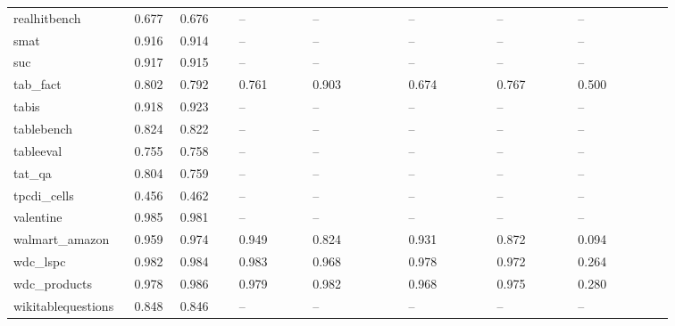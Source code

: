 \begin{table}[htbp]
\begin{tabular}{p{0.112\linewidth}p{0.063\linewidth}p{0.081\linewidth}p{0.104\linewidth}p{0.130\linewidth}p{0.123\linewidth}p{0.112\linewidth}p{0.133\linewidth}}
realhitbench & 0.677 & 0.676 & -- & -- & -- & -- & -- \\
smat & 0.916 & 0.914 & -- & -- & -- & -- & -- \\
suc & 0.917 & 0.915 & -- & -- & -- & -- & -- \\
tab\_\allowbreak{}fact & 0.802 & 0.792 & 0.761 & 0.903 & 0.674 & 0.767 & 0.500 \\
tabis & 0.918 & 0.923 & -- & -- & -- & -- & -- \\
tablebench & 0.824 & 0.822 & -- & -- & -- & -- & -- \\
tableeval & 0.755 & 0.758 & -- & -- & -- & -- & -- \\
tat\_\allowbreak{}qa & 0.804 & 0.759 & -- & -- & -- & -- & -- \\
tpcdi\_\allowbreak{}cells & 0.456 & 0.462 & -- & -- & -- & -- & -- \\
valentine & 0.985 & 0.981 & -- & -- & -- & -- & -- \\
walmart\_\allowbreak{}amazon & 0.959 & 0.974 & 0.949 & 0.824 & 0.931 & 0.872 & 0.094 \\
wdc\_\allowbreak{}lspc & 0.982 & 0.984 & 0.983 & 0.968 & 0.978 & 0.972 & 0.264 \\
wdc\_\allowbreak{}products & 0.978 & 0.986 & 0.979 & 0.982 & 0.968 & 0.975 & 0.280 \\
wikitablequestions & 0.848 & 0.846 & -- & -- & -- & -- & -- \\
\bottomrule
\end{tabular}
\end{table}
